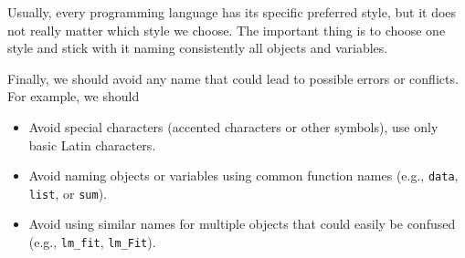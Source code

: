 \documentclass[
  11pt,
]{book}
\providecommand{\tightlist}{%
  \setlength{\itemsep}{0pt}\setlength{\parskip}{0pt}}
\begin{document}
Usually, every programming language has its specific preferred style, but it does not really matter which style we choose. The important thing is to choose one style and stick with it naming consistently all objects and variables.

Finally, we should avoid any name that could lead to possible errors or conflicts. For example, we should

\begin{itemize}
\tightlist
\item
  Avoid special characters (accented characters or other symbols), use only basic Latin characters.
\item
  Avoid naming objects or variables using common function names (e.g., \texttt{data}, \texttt{list}, or \texttt{sum}).
\item
  Avoid using similar names for multiple objects that could easily be confused (e.g., \texttt{lm\_fit}, \texttt{lm\_Fit}).
\end{itemize}
\end{document}
